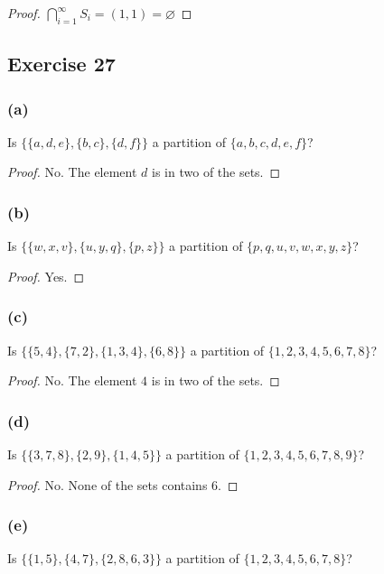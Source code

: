 \documentclass[14pt]{extarticle}
\newcommand{\es}{\varnothing}
\newcommand{\dps}{\displaystyle}
\begin{document}
\begin{proof}
  \(\dps \bigcap_{i=1}^{\infty}S_i = (1, 1) = \es\)
\end{proof}

\subsection{Exercise 27}

\subsubsection{(a)}
Is \(\{\{a, d, e\}, \{b, c\}, \{d, f\}\}\) a partition of
\(\{a, b, c, d, e, f\}\)?

\begin{proof}
  No. The element $d$ is in two of the sets.
\end{proof}

\subsubsection{(b)}
Is \(\{\{w, x, v\}, \{u, y, q\}, \{p, z\}\}\) a partition of \(\{p, q, u, v, w, x, y, z\}\)?

\begin{proof}
  Yes.
\end{proof}

\subsubsection{(c)}
Is \(\{\{5, 4\}, \{7, 2\}, \{1, 3, 4\}, \{6, 8\}\}\) a partition of \(\{1, 2, 3, 4, 5, 6, 7, 8\}\)?

\begin{proof}
  No. The element $4$ is in two of the sets.
\end{proof}

\subsubsection{(d)}
Is \(\{\{3, 7, 8\}, \{2, 9\}, \{1, 4, 5\}\}\) a partition of \(\{1, 2, 3, 4, 5, 6, 7, 8, 9\}\)?

\begin{proof}
  No. None of the sets contains 6.
\end{proof}

\subsubsection{(e)}
Is \(\{\{1, 5\}, \{4, 7\}, \{2, 8, 6, 3\}\}\) a partition of \(\{1, 2, 3, 4, 5, 6, 7, 8\}\)?
\end{document}
